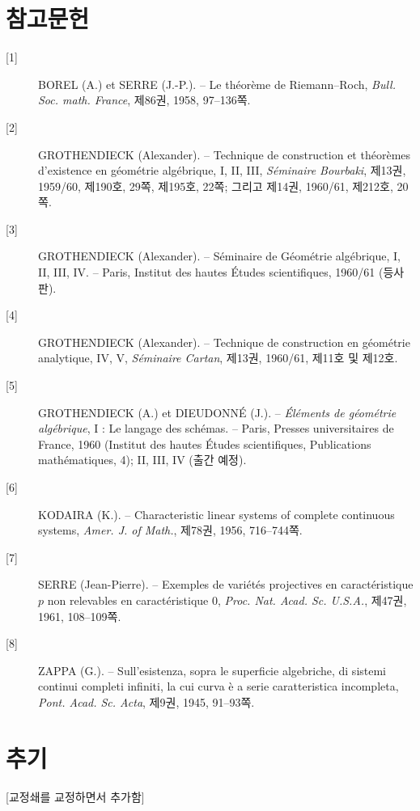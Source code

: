 \documentclass[11pt,twoside,openany]{book}
\numberwithin{equation}{section}
\theoremstyle{plain}
\theoremstyle{definition}
\theoremstyle{remark}
\begin{document}
\section*{참고문헌}

\begin{description}
\item[{[1]}] BOREL (A.) et SERRE (J.-P.). -- Le théorème de Riemann--Roch,
\emph{Bull. Soc. math. France}, 제86권, 1958, 97--136쪽.

\item[{[2]}] GROTHENDIECK (Alexander). -- Technique de construction et
théorèmes d'existence en géométrie algébrique, I, II, III, \emph{Séminaire
Bourbaki}, 제13권, 1959/60, 제190호, 29쪽, 제195호, 22쪽; 그리고 제14권,
1960/61, 제212호, 20쪽.

\item[{[3]}] GROTHENDIECK (Alexander). -- Séminaire de Géométrie algébrique,
I, II, III, IV. -- Paris, Institut des hautes Études scientifiques, 1960/61
(등사판).

\item[{[4]}] GROTHENDIECK (Alexander). -- Technique de construction en
géométrie analytique, IV, V, \emph{Séminaire Cartan}, 제13권, 1960/61,
제11호 및 제12호.

\item[{[5]}] GROTHENDIECK (A.) et DIEUDONNÉ (J.). -- \emph{Éléments de
géométrie algébrique}, I : Le langage des schémas. -- Paris, Presses
universitaires de France, 1960 (Institut des hautes Études scientifiques,
Publications mathématiques, 4); II, III, IV (출간 예정).

\item[{[6]}] KODAIRA (K.). -- Characteristic linear systems of complete
continuous systems, \emph{Amer. J. of Math.}, 제78권, 1956, 716--744쪽.

\item[{[7]}] SERRE (Jean-Pierre). -- Exemples de variétés projectives en
caractéristique $p$ non relevables en caractéristique 0, \emph{Proc. Nat. Acad.
Sc. U.S.A.}, 제47권, 1961, 108--109쪽.

\item[{[8]}] ZAPPA (G.). -- Sull'esistenza, sopra le superficie algebriche, di
sistemi continui completi infiniti, la cui curva è a serie caratteristica
incompleta, \emph{Pont. Acad. Sc. Acta}, 제9권, 1945, 91--93쪽.
\end{description}

\section*{추기}
\begin{center}
{\small [교정쇄를 교정하면서 추가함]}
\end{center}
\end{document}
